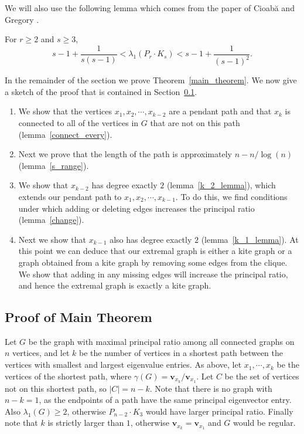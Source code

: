 We will also use the following lemma which comes from the
paper of Cioab\u{a} and Gregory \cite{CioabaGregory2007}.

\begin{lemma}\label{kite_lambda}
  For $r \geq 2$ and $s \geq 3$,
   \[ s - 1 + \frac{1}{s(s-1)} < \lambda_1(P_r \cdot K_s) < s - 1 + \frac{1}{(s-1)^2} . \]
\end{lemma}

In the remainder of the section  we prove Theorem~\ref{main_theorem}.
We now give a sketch of the proof that is contained in Section~\ref{sec_proof}.

\begin{enumerate}
 \item We show that the vertices $x_1, x_2, \cdots, x_{k-2}$ are
   a pendant path and that $x_k$ is connected to all of the vertices
   in $G$ that are not on this path (lemma~\ref{connect_every}).
 \item Next we prove that the length of the path is approximately
   $n - n/\log(n)$ (lemma~\ref{s_range}).
 \item We show that $x_{k-2}$ has degree exactly $2$ (lemma~\ref{k_2_lemma}), which
   extends our pendant path to $x_1, x_2, \cdots, x_{k-1}$.
   To do this, we find conditions under which adding or deleting
   edges increases the principal ratio (lemma~\ref{change}).
 \item Next we show that $x_{k-1}$ also has degree exactly $2$ (lemma~\ref{k_1_lemma}).
   At this point we can deduce that our extremal graph is either
   a kite graph or a graph obtained from a kite graph
   by removing some edges from the clique.  We show that
   adding in any missing edges will increase the principal ratio,
   and hence the extremal graph is exactly a kite graph.
   
\end{enumerate}

\subsection{Proof of Main Theorem}\label{sec_proof}



Let $G$ be the graph with maximal principal ratio among all connected
graphs on $n$ vertices, and let $k$ be the number of vertices in a
shortest path between the vertices with smallest and largest eigenvalue
entries. As above, let $x_1,\cdots, x_k$ be the vertices of the shortest path, where
$\gamma(G) = \mathbf{v}_{x_k} / \mathbf{v}_{x_1}$.  Let $C$ be the set of vertices not on this shortest
path, so $|C| = n-k$.  Note that there is no graph with $n-k=1$, as the endpoints of a path have the same principal eigenvector entry.  Also
$\lambda_1(G) \geq 2$, otherwise $P_{n-2} \cdot K_3$ would have larger
principal ratio.  Finally note that $k$ is strictly larger than $1$,
otherwise $\mathbf{v}_{x_k} = \mathbf{v}_{x_1}$ and $G$ would be regular.


